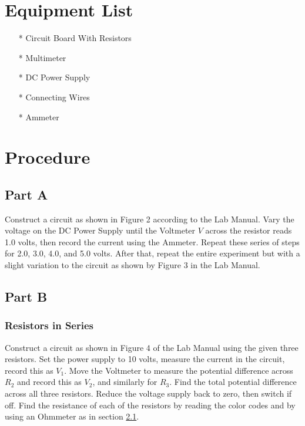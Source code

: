 \documentclass[titlepage]{article}
\begin{document}
\section{Equipment List}\label{sec:equipment_list}
\begin{itemize}
\item[*] Circuit Board With Resistors
\item[*] Multimeter
\item[*] DC Power Supply
\item[*] Connecting Wires
\item[*] Ammeter
\end{itemize}

\section{Procedure}\label{sec:procedure}

\subsection{Part A}\label{sub:part_a-proc}
Construct a circuit as shown in Figure 2 according to the Lab Manual. Vary the voltage on the DC Power Supply until the Voltmeter $V$ across the resistor reads 1.0 volts, then record the current using the Ammeter. Repeat these series of steps for 2.0, 3.0, 4.0, and 5.0 volts. After that, repeat the entire experiment but with a slight variation to the circuit as shown by Figure 3 in the Lab Manual.

\subsection{Part B}\label{sub:part_b-proc}

\subsubsection{Resistors in Series}\label{ssub:resistors_in_series-proc}
Construct a circuit as shown in Figure 4 of the Lab Manual using the given three resistors. Set the power supply to 10 volts, measure the current in the circuit, record this as $V_1$. Move the Voltmeter to measure the potential difference across $R_2$ and record this as $V_2$, and similarly for $R_3$. Find the total potential difference across all three resistors. Reduce the voltage supply back to zero, then switch if off. Find the resistance of each of the resistors by reading the color codes and by using an Ohmmeter as in section \ref{sub:part_a-proc}.
\end{document}
